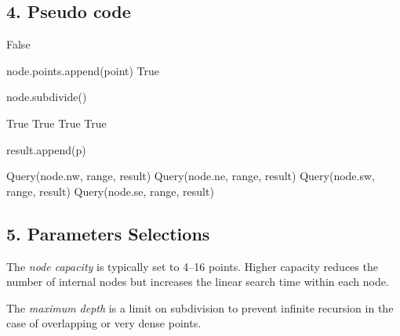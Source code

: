\subsection{4. Pseudo code}
\begin{algorithm}
\begin{algorithmic}[1]
\label{alg:qt_insert}
        \State \Return False
    \EndIf
        
        \State node.points.append(point)
        \State \Return True
    \EndIf
        
        \State node.subdivide()
    \EndIf
        
        \State \Return True
    \EndIf
        \State \Return True
    \EndIf
        \State \Return True
    \EndIf
        \State \Return True
    \EndIf
\EndFunction

\label{alg:qt_query}
        \State \Return
    \EndIf
        
            \State result.append(p)
        \EndIf
    \EndFor
        
        \State Query(node.nw, range, result)
        \State Query(node.ne, range, result)
        \State Query(node.sw, range, result)
        \State Query(node.se, range, result)
    \EndIf
\EndFunction
\end{algorithmic}
\end{algorithm}

\subsection{5. Parameters Selections}
\begin{definition}
\label{def:qt_node_capacity}
The \emph{node capacity} is typically set to 4--16 points. Higher capacity reduces the number of internal nodes but increases the linear search time within each node.
\end{definition}

\begin{definition}
\label{def:qt_max_depth}
The \emph{maximum depth} is a limit on subdivision to prevent infinite recursion in the case of overlapping or very dense points.
\end{definition}

